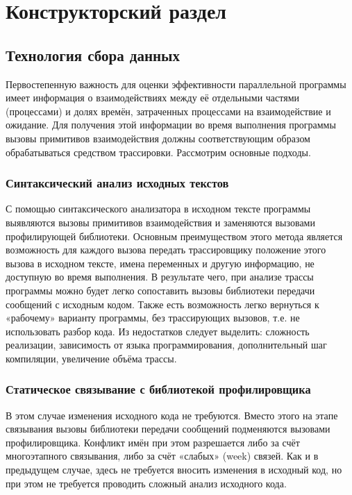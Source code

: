 \chapter{Конструкторский раздел}
\label{cha:design}
\section{Технология сбора данных}
Первостепенную важность для оценки эффективности параллельной программы имеет информация о взаимодействиях между её отдельными частями (процессами) и долях времён, затраченных процессами на взаимодействие и ожидание. Для  получения этой информации во время выполнения программы вызовы примитивов взаимодействия должны соответствующим образом обрабатываться средством трассировки. Рассмотрим основные подходы.
\subsection{Синтаксический анализ исходных текстов} С помощью синтаксического анализатора в исходном тексте программы выявляются вызовы примитивов взаимодействия и заменяются вызовами профилирующей библиотеки. Основным преимуществом этого метода является возможность для каждого вызова передать трассировщику положение этого вызова в исходном тексте, имена переменных и другую информацию, не доступную во время выполнения. В результате чего, при анализе трассы программы можно будет легко сопоставить вызовы библиотеки передачи сообщений с исходным кодом. Также есть возможность легко вернуться к «рабочему» варианту программы, без трассирующих вызовов, т.е. не использовать разбор кода. Из недостатков следует выделить: сложность реализации, зависимость от языка программирования, дополнительный шаг компиляции, увеличение объёма трассы.
\subsection{Статическое связывание с библиотекой профилировщика} В этом случае изменения исходного кода не требуются. Вместо этого на этапе связывания вызовы библиотеки передачи сообщений подменяются вызовами профилировщика. Конфликт имён при этом разрешается либо за счёт многоэтапного связывания, либо за счёт «слабых» (week) связей. Как и в предыдущем случае, здесь не требуется вносить изменения в исходный код, но при этом не требуется проводить сложный анализ исходного кода.
